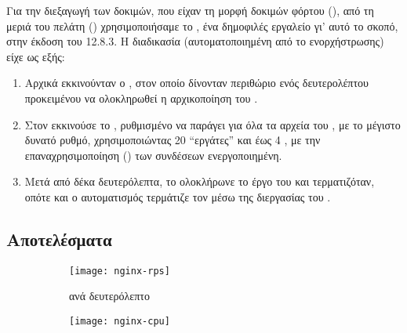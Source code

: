 Για την διεξαγωγή των δοκιμών, που είχαν τη μορφή δοκιμών φόρτου 
(), από τη μεριά του πελάτη ()
χρησιμοποιήσαμε το  \cite{vegeta}, ένα δημοφιλές εργαλείο γι' αυτό το
σκοπό, στην έκδοση του 12.8.3. Η διαδικασία (αυτοματοποιημένη από το 
ενορχήστρωσης) είχε ως εξής:
\begin{enumerate}
    \item Αρχικά εκκινούνταν ο \osv{} \guest{}, στον οποίο δίνονταν περιθώριο
          ενός δευτερολέπτου προκειμένου να ολοκληρωθεί η αρχικοποίηση του
          .
    \item Στον \host{} εκκινούσε το , ρυθμισμένο να παράγει  για όλα τα αρχεία του , με το μέγιστο
          δυνατό ρυθμό, χρησιμοποιώντας 20 ``εργάτες'' και έως 4 , με
          την επαναχρησιμοποίηση () των συνδέσεων 
          ενεργοποιημένη.
    \item Μετά από δέκα δευτερόλεπτα, το  ολοκλήρωνε το έργο του και
          τερματιζόταν, οπότε και ο αυτοματισμός τερμάτιζε τον \guest{} μέσω
          της διεργασίας του \qemu{}.
\end{enumerate}

\subsection{Αποτελέσματα}

\begin{figure}
    \begin{minipage}[c][\textheight]{\textwidth}
        \begin{subfigure}[c][0.5\textheight]{\textwidth}
            \caption{ ανά δευτερόλεπτο}
            \texttt{[image: nginx-rps]}
            \label{fig:nginx-rps}
        \end{subfigure}
        \begin{subfigure}[c][0.5\textheight]{\textwidth}
            \caption{}
            \texttt{[image: nginx-cpu]}
            \label{fig:nginx-cpu}
        \end{subfigure}
        \caption{}
        \label{fig:nginx}
    \end{minipage}
\end{figure}


